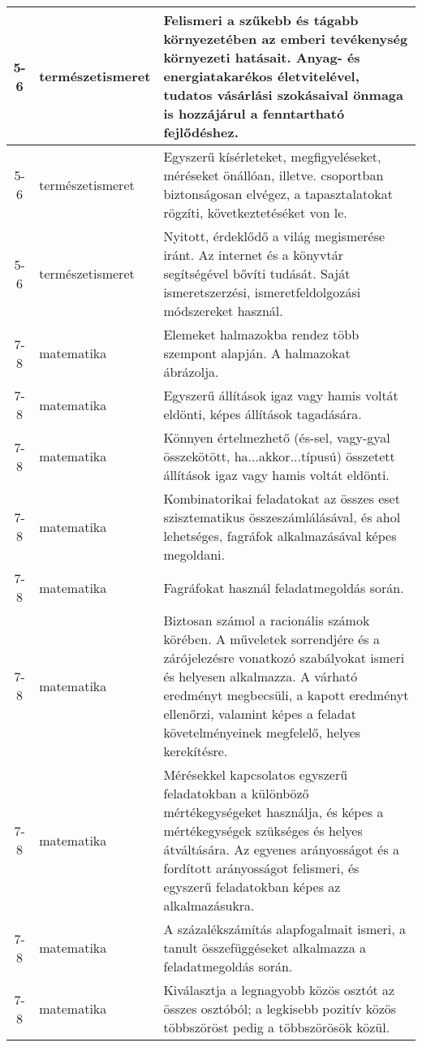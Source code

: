 \begin{small}
\begin{longtable}{c | p{2cm} |  p{11cm} }
              5-6 & természetismeret & Felismeri a szűkebb és tágabb környezetében az emberi tevékenység környezeti hatásait. Anyag- és energiatakarékos életvitelével, tudatos vásárlási szokásaival önmaga is hozzájárul a fenntartható fejlődéshez. \\ \hline
              5-6 & természetismeret & Egyszerű kísérleteket, megfigyeléseket, méréseket önállóan, illetve. csoportban biztonságosan elvégez, a tapasztalatokat rögzíti, következtetéséket von le. \\ \hline
              5-6 & természetismeret & Nyitott, érdeklődő a világ megismerése iránt. Az internet és a könyvtár segítségével bővíti tudását. Saját ismeretszerzési, ismeretfeldolgozási módszereket használ. \\ \hline
              7-8 & matematika & Elemeket halmazokba rendez több szempont alapján. A halmazokat ábrázolja. \\ \hline
              7-8 & matematika & Egyszerű állítások igaz vagy hamis voltát eldönti, képes állítások tagadására. \\ \hline
              7-8 & matematika & Könnyen értelmezhető (és-sel, vagy-gyal összekötött, ha...akkor...típusú) összetett állítások igaz vagy hamis voltát eldönti. \\ \hline
              7-8 & matematika & Kombinatorikai feladatokat az összes eset szisztematikus összeszámlálásával, és ahol lehetséges, fagráfok alkalmazásával képes megoldani. \\ \hline
              7-8 & matematika & Fagráfokat használ feladatmegoldás során. \\ \hline
              7-8 & matematika & Biztosan számol a racionális számok körében. A műveletek sorrendjére és a zárójelezésre vonatkozó szabályokat ismeri és helyesen alkalmazza. A várható eredményt megbecsüli, a kapott  eredményt ellenőrzi, valamint képes a feladat követelményeinek megfelelő, helyes kerekítésre. \\ \hline
              7-8 & matematika & Mérésekkel kapcsolatos egyszerű feladatokban a különböző mértékegységeket használja, és képes a mértékegységek szükséges és helyes átváltására. Az egyenes arányosságot és a fordított arányosságot felismeri, és egyszerű feladatokban képes az alkalmazásukra.
 \\ \hline
              7-8 & matematika & A százalékszámítás alapfogalmait ismeri, a tanult összefüggéseket alkalmazza a  feladatmegoldás során. \\ \hline
              7-8 & matematika & Kiválasztja a legnagyobb közös osztót az összes osztóból; a legkisebb pozitív közös többszöröst pedig a többszörösök közül. \\ \hline

\end{longtable}
\end{small}
